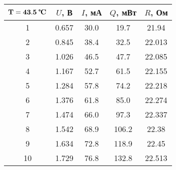 \begin{tabular}{ccccc}
\toprule
$\mathbf{T = 43.5}\;\textbf{\textcelsius}$ & $U$, В & $I$, мА & $Q$, мВт & $R$, Ом \\
\midrule
1 & 0.657 & 30.0 & 19.7 & 21.94 \\
2 & 0.845 & 38.4 & 32.5 & 22.013 \\
3 & 1.026 & 46.5 & 47.7 & 22.085 \\
4 & 1.167 & 52.7 & 61.5 & 22.155 \\
5 & 1.284 & 57.8 & 74.2 & 22.218 \\
6 & 1.376 & 61.8 & 85.0 & 22.274 \\
7 & 1.474 & 66.0 & 97.3 & 22.337 \\
8 & 1.542 & 68.9 & 106.2 & 22.38 \\
9 & 1.634 & 72.8 & 118.9 & 22.45 \\
10 & 1.729 & 76.8 & 132.8 & 22.513 \\
\bottomrule
\end{tabular}
